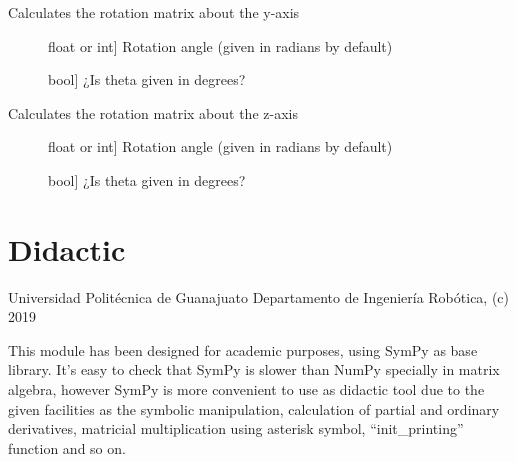 \documentclass[letterpaper,10pt,english]{sphinxmanual}
\begin{document}
\begin{fulllineitems}
\label{\detokenize{_src/transformations:rkd.transformations.roty}}
Calculates the rotation matrix about the y-axis
\begin{description}
\item[{}] \leavevmode{[}float or int{]}
Rotation angle (given in radians by default)

\item[{}] \leavevmode{[}bool{]}
¿Is theta given in degrees?

\end{description}

\end{fulllineitems}


\begin{fulllineitems}
\label{\detokenize{_src/transformations:rkd.transformations.rotz}}
Calculates the rotation matrix about the z-axis
\begin{description}
\item[{}] \leavevmode{[}float or int{]}
Rotation angle (given in radians by default)

\item[{}] \leavevmode{[}bool{]}
¿Is theta given in degrees?

\end{description}

\end{fulllineitems}



\section{Didactic}
\label{\detokenize{_src/didactic:didactic}}\label{\detokenize{_src/didactic::doc}}\label{\detokenize{_src/didactic:module-rkd.didactic}}
Universidad Politécnica de Guanajuato
Departamento de Ingeniería Robótica, (c) 2019

This module has been designed for academic purposes, using SymPy as base library. 
It’s easy to check that SymPy is slower than NumPy specially in matrix algebra, 
however SymPy is more convenient to use as didactic tool due to the given facilities 
as the symbolic manipulation, calculation of partial and ordinary derivatives, 
matricial multiplication using asterisk symbol, “init\_printing” function and so on.
\end{document}
